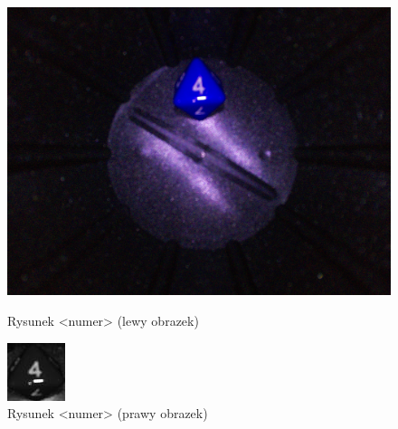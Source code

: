 \begin{figure}[H]
    \centering
    \begin{minipage}[t]{0.45\linewidth}
        \centering
        \includegraphics[width=\linewidth]{chapters/04-czytanie/figures/4raw}
        \caption{Rysunek <numer> (lewy obrazek)}
        \label{fig:4raw}
    \end{minipage}
    \hfill
    \begin{minipage}[t]{0.45\linewidth}
        \centering
        \includegraphics[width=\linewidth]{chapters/04-czytanie/figures/4processed}
        \caption{Rysunek <numer> (prawy obrazek)}
        \label{fig:4proc}
    \end{minipage}
\end{figure}


